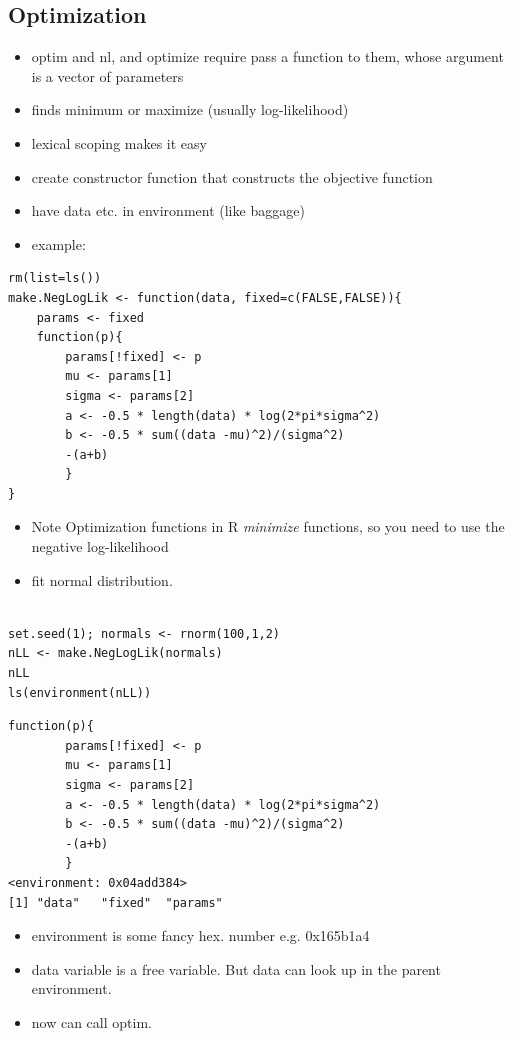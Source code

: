 \documentclass[11pt]{article}
\begin{document}
\subsection{Optimization}
\label{sec-2-3}

\begin{itemize}
\item optim and nl, and optimize require pass a function to them, whose
  argument is a vector of parameters
\item finds minimum or maximize (usually log-likelihood)
\item lexical scoping makes it easy
\item create constructor function that constructs the objective function
\item have data etc. in environment (like baggage)
\item example:
\end{itemize}

\begin{verbatim}
rm(list=ls())
make.NegLogLik <- function(data, fixed=c(FALSE,FALSE)){
    params <- fixed
    function(p){
        params[!fixed] <- p
        mu <- params[1]
        sigma <- params[2]
        a <- -0.5 * length(data) * log(2*pi*sigma^2)
        b <- -0.5 * sum((data -mu)^2)/(sigma^2)
        -(a+b)
        }
}
\end{verbatim}


\begin{itemize}
\item Note Optimization functions in R \emph{minimize} functions, so you need
  to use the negative log-likelihood
\item fit normal distribution.
\end{itemize}


\begin{verbatim}

set.seed(1); normals <- rnorm(100,1,2)
nLL <- make.NegLogLik(normals)
nLL
ls(environment(nLL))
\end{verbatim}


\begin{verbatim}
function(p){
        params[!fixed] <- p
        mu <- params[1]
        sigma <- params[2]
        a <- -0.5 * length(data) * log(2*pi*sigma^2)
        b <- -0.5 * sum((data -mu)^2)/(sigma^2)
        -(a+b)
        }
<environment: 0x04add384>
[1] "data"   "fixed"  "params"
\end{verbatim}

\begin{itemize}
\item environment is some fancy hex. number e.g. 0x165b1a4
\item data variable is a free variable. But data can look up in the
  parent environment.
\item now can call optim.
\end{itemize}
\end{document}
